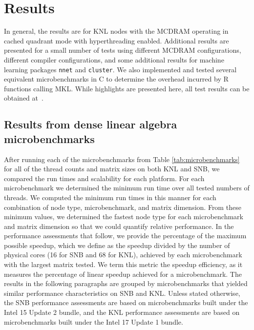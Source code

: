 \section{Results} \label{sec:results}

In general, the results are for KNL nodes with the MCDRAM operating in cached quadrant
mode with hyperthreading enabled.  Additional results are presented for a small number
of tests using different MCDRAM configurations, different compiler configurations, and
some additional results for machine learning packages \texttt{nnet} and
\texttt{cluster}. We also implemented and tested several equivalent microbenchmarks in
C to determine the overhead incurred by R functions calling MKL. While highlights are
presented here, all test results can be obtained at~\cite{iu:stamp2017}.

\subsection{Results from dense linear algebra microbenchmarks}

After running each of the microbenchmarks from Table \ref{tab:microbenchmarks} for all of
the thread counts and matrix sizes on both KNL and SNB, we compared the run times and
scalability for each platform. For each microbenchmark we determined the minimum run time
over all tested numbers of threads. We computed the minimum run times in this manner for
each combination of node type, microbenchmark, and matrix dimension. From these minimum
values, we determined the fastest node type for each microbenchmark and matrix dimension
so that we could quantify relative performance. In the performance assessments that
follow, we provide the percentage of the maximum possible speedup, which we define as the
speedup divided by the number of physical cores (16 for SNB and 68 for KNL), achieved by
each microbenchmark with the largest matrix tested. We term this metric the speedup efficiency,
as it measures the percentage of linear speedup achieved for a microbenchmark. The results in
the following paragraphs are grouped by microbenchmarks that yielded similar performance
characteristics on SNB and KNL. Unless stated otherwise, the SNB performance assessments
are based on microbenchmarks built under the Intel 15 Update 2 bundle, and the KNL
performance assessments are based on microbenchmarks built under the Intel 17 Update 1
bundle.

